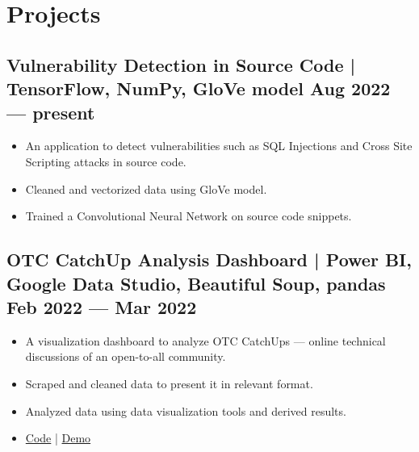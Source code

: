 \documentclass[10pt]{article}
\newenvironment{zitemize}{
\begin{itemize}\itemsep2pt \parskip0pt \parsep1pt}
{\end{itemize}\vspace{-0.7cm}}
\begin{document}
\section{Projects} %



\subsection*{Vulnerability Detection in Source Code | TensorFlow, NumPy, GloVe model \hfill Aug 2022 --- present}
    \begin{zitemize}
    \item An application to detect vulnerabilities such as SQL Injections and Cross Site Scripting attacks in source code.
     \item Cleaned and vectorized data using GloVe model.
        \item Trained a Convolutional Neural Network on source code snippets.
       
    \end{zitemize}
\subsection*{OTC CatchUp Analysis Dashboard | Power BI, Google Data Studio, Beautiful Soup, pandas \hfill 
Feb 2022 --- Mar 2022}
    \begin{zitemize}
    \item A visualization dashboard to analyze OTC CatchUps --- online technical discussions of an open-to-all community.
     \item Scraped and cleaned data to present it in relevant format.
        \item Analyzed data using data visualization tools and derived results.
       \item \href{https://github.com/mihikagaonkar/OTC-Dashboard/}{Code}
| \href{https://mihikagaonkar.github.io/OTC-Dashboard/data_studio}{Demo}
    \end{zitemize}
\end{document}
